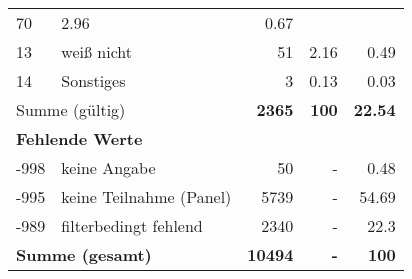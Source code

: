 \begin{longtable}{lXrrr}
       \num{70} &
       \num[round-mode=places,round-precision=2]{2,96} &
         \num[round-mode=places,round-precision=2]{0,67} \\

     13 &
     \multicolumn{1}{X}{ weiß nicht   } &


       \num{51} &
       \num[round-mode=places,round-precision=2]{2,16} &
         \num[round-mode=places,round-precision=2]{0,49} \\

     14 &
     \multicolumn{1}{X}{ Sonstiges   } &


       \num{3} &
       \num[round-mode=places,round-precision=2]{0,13} &
         \num[round-mode=places,round-precision=2]{0,03} \\
     \midrule
     \multicolumn{2}{l}{Summe (gültig)} &
       \textbf{\num{2365}} &
     \textbf{100} &
       \textbf{\num[round-mode=places,round-precision=2]{22,54}} \\
     \multicolumn{5}{l}{\textbf{Fehlende Werte}}\\
       -998 &
       keine Angabe &
         \num{50} &
        - &
         \num[round-mode=places,round-precision=2]{0,48} \\
       -995 &
       keine Teilnahme (Panel) &
         \num{5739} &
        - &
         \num[round-mode=places,round-precision=2]{54,69} \\
       -989 &
       filterbedingt fehlend &
         \num{2340} &
        - &
         \num[round-mode=places,round-precision=2]{22,3} \\
     \midrule
     \multicolumn{2}{l}{\textbf{Summe (gesamt)}} &
          \textbf{\num{10494}} &
        \textbf{-} &
        \textbf{100} \\
     \bottomrule
     \end{longtable}
     

